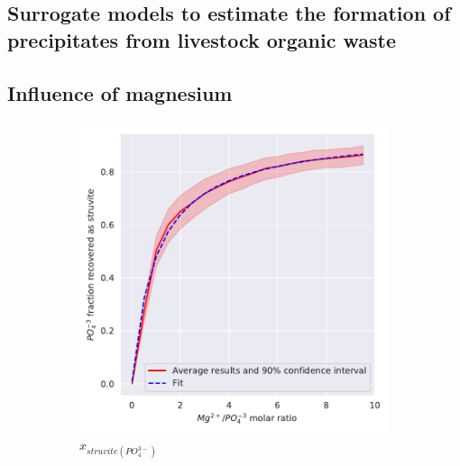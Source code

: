 \begin{refsection}[referencesCh3]
\newpage

\section{Surrogate models to estimate the formation of precipitates from livestock organic waste}
\subsection{Influence of magnesium} 
\begin{figure}[h] 
	\centering
	\begin{subfigure}[t]{0.32\textheight}
		\includegraphics[width=\textwidth]{gfx/AppendixB/plotStrYield_Mg}
		\caption{$x_{struvite \left(PO_{4}^{3-}\right)}$}
		\label{fig:estimation_Mg_value}
	\end{subfigure}
	\begin{subfigure}[t]{0.32\textheight}

\end{subfigure}
\end{figure}
\end{refsection}

